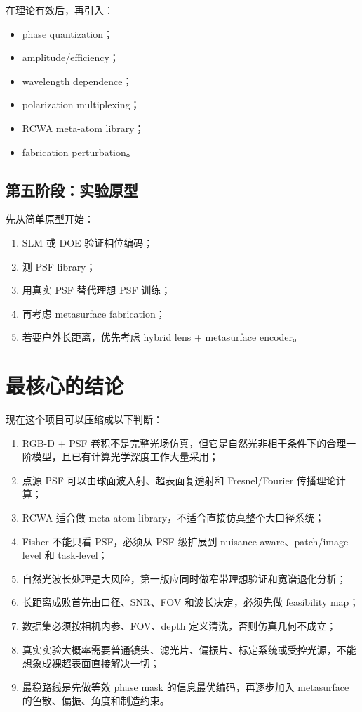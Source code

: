 \documentclass[11pt,a4paper,fontset=none]{ctexart}
\begin{document}
在理论有效后，再引入：
\begin{itemize}
  \item phase quantization；
  \item amplitude/efficiency；
  \item wavelength dependence；
  \item polarization multiplexing；
  \item RCWA meta-atom library；
  \item fabrication perturbation。
\end{itemize}

\subsection{第五阶段：实验原型}

先从简单原型开始：
\begin{enumerate}
  \item SLM 或 DOE 验证相位编码；
  \item 测 PSF library；
  \item 用真实 PSF 替代理想 PSF 训练；
  \item 再考虑 metasurface fabrication；
  \item 若要户外长距离，优先考虑 hybrid lens + metasurface encoder。
\end{enumerate}

\section{最核心的结论}

现在这个项目可以压缩成以下判断：
\begin{enumerate}
  \item RGB-D + PSF 卷积不是完整光场仿真，但它是自然光非相干条件下的合理一阶模型，且已有计算光学深度工作大量采用；
  \item 点源 PSF 可以由球面波入射、超表面复透射和 Fresnel/Fourier 传播理论计算；
  \item RCWA 适合做 meta-atom library，不适合直接仿真整个大口径系统；
  \item Fisher 不能只看 PSF，必须从 PSF 级扩展到 nuisance-aware、patch/image-level 和 task-level；
  \item 自然光波长处理是大风险，第一版应同时做窄带理想验证和宽谱退化分析；
  \item 长距离成败首先由口径、SNR、FOV 和波长决定，必须先做 feasibility map；
  \item 数据集必须按相机内参、FOV、depth 定义清洗，否则仿真几何不成立；
  \item 真实实验大概率需要普通镜头、滤光片、偏振片、标定系统或受控光源，不能想象成裸超表面直接解决一切；
  \item 最稳路线是先做等效 phase mask 的信息最优编码，再逐步加入 metasurface 的色散、偏振、角度和制造约束。
\end{enumerate}
\end{document}
